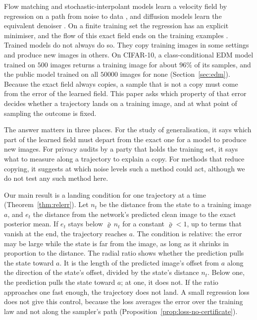 \documentclass{article} %
\theoremstyle{plain}
\theoremstyle{definition}
\theoremstyle{remark}
\begin{document}
Flow matching and stochastic-interpolant models
\citep{lipman2023flow,albergo2023building,liu2023rectified,albergo2023stochastic} learn a velocity
field by regression on a path from noise to data \citep{tong2024improving}, and diffusion models
learn the equivalent denoiser \citep{karras2022elucidating}. On a finite training set the regression
has an explicit minimiser, and the flow of this exact field ends on the training examples
\citep{gu2023memorization,biroli2023diffusion,gao2024flow,bertrand2025closed,wan2025elucidating}.
Trained models do not always do so. They copy training images in some settings
\citep{carlini2023extracting,somepalli2023diffusion,sesmat2026leaks} and produce new images in
others. On CIFAR-10, a class-conditional EDM model trained on $500$ images returns a training image
for about $96\%$ of its samples, and the public model trained on all $50000$ images for none
(Section~\ref{sec:edm}). Because the exact field always copies, a sample that is not a copy must
come from the error of the learned field. This paper asks which property of that error decides
whether a trajectory lands on a training image, and at what point of sampling the outcome is
fixed.

The answer matters in three places. For the study of generalisation, it says which part of the
learned field must depart from the exact one for a model to produce new images. For privacy audits
by a party that holds the training set, it says what to measure along a trajectory to explain a
copy. For methods that reduce copying, it suggests at which noise levels such a method could act,
although we do not test any such method here.

Our main result is a landing condition for one trajectory at a time
(Theorem~\ref{thm:relerr}). Let $n_t$ be the distance from the state to a training image $a$, and
$e_t$ the distance from the network's predicted clean image to the exact posterior mean. If $e_t$
stays below $\bar\varrho\,n_t$ for a constant $\bar\varrho<1$, up to terms that vanish at the end,
the trajectory reaches $a$. The condition is relative: the error may be large while the state is
far from the image, as long as it shrinks in proportion to the distance. The radial ratio shows
whether the prediction pulls the state toward $a$. It is the length of the predicted image's
offset from $a$ along the direction of the state's offset, divided by the state's distance $n_t$.
Below one, the prediction pulls the state toward $a$; at one, it does not. If the ratio approaches one fast enough, the
trajectory does not land. A small regression loss does not give this control, because the loss
averages the error over the training law and not along the sampler's path
(Proposition~\ref{prop:loss-no-certificate}).
\end{document}
